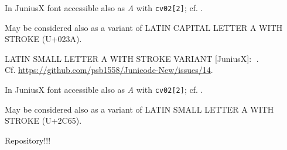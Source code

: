 \documentclass{article}
\newcommand{\Jglyph}[1]{{\relsize{2}\J#1}}
\begin{document}
\begin{description}
  In JuniusX font accessible also as \textit{A} with \texttt{cv02[2]};
  cf. \autocite[p. 7]{baker20:_opent_featur_junius_junius}.
% 

    May be considered also as a variant of LATIN CAPITAL LETTER A WITH
  STROKE (U+023A).

  
\item [0xF001F] LATIN SMALL LETTER A WITH STROKE  VARIANT [JuniusX]: 
  \Jglyph{󰀟}.\\ Cf. \url{https://github.com/psb1558/Junicode-New/issues/14}.

  In JuniusX font accessible also as \textit{A} with \texttt{cv02[2]};
  cf. \autocite[p. 7]{baker20:_opent_featur_junius_junius}.

  May be considered also as a variant of LATIN SMALL LETTER A WITH
  STROKE (U+2C65).
\item   \cite{vrtel-wierczyński50:_wybór}

\end{description}

Repository!!!
\printbibliography
\end{document}
